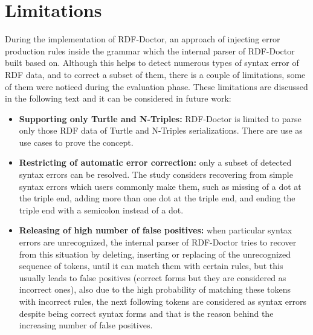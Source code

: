 

\section{Limitations}
During the implementation of RDF-Doctor, an approach of injecting error production rules inside the grammar which the internal parser of RDF-Doctor built based on. Although this helps to detect numerous types of syntax error of RDF data, and to correct a subset of them, there is a couple of limitations, some of them were noticed during the evaluation phase. These limitations are discussed in the following text and it can be considered in future work:  
\begin{itemize}
    \item \textbf{Supporting only Turtle and N-Triples:} RDF-Doctor is limited to parse only those RDF data of Turtle and N-Triples serializations. There are use as use cases to prove the concept. 
    \item \textbf{Restricting of automatic error correction:} only a subset of  detected syntax errors can be resolved. The study considers recovering from simple syntax errors which users commonly make them, such as missing of a dot at the triple end,  adding more than one dot at the triple end, and ending the triple end with a semicolon instead of a dot.   

    \item \textbf{Releasing of high number of false positives:}  when particular syntax errors are unrecognized, the internal parser of RDF-Doctor tries to recover from this situation by deleting, inserting or replacing of the unrecognized sequence of tokens, until it can match them with certain rules, but this usually leads to false positives (correct forms but they are considered as incorrect ones), also due to the high probability of matching these tokens with incorrect rules, the next following tokens are considered as syntax errors despite being correct syntax forms and that is the reason behind the increasing number of false positives.  

\end{itemize}


